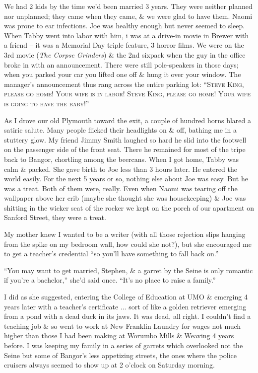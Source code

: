 \documentclass{article}
\numberwithin{equation}{section}
\begin{document}
 We had 2 kids by the time we'd been married 3 years. They were neither planned nor unplanned; they came when they came, \& we were glad to have them. Naomi was prone to ear infections. Joe was healthy enough but never seemed to sleep. When Tabby went into labor with him, i was at a drive-in movie in Brewer with a friend -- it was a Memorial Day triple feature, 3 horror films. We were on the 3rd movie (\textit{The Corpse Grinders}) \& the 2nd sixpack when the guy in the office broke in with an announcement. There were still pole-speakers in those days; when you parked your car you lifted one off \& hung it over your window. The manager's announcement thus rang across the entire parking lot: ``\textsc{Steve King, please go home! Your wife is in labor! Steve King, please go home! Your wife is going to have the baby!}''

As I drove our old Plymouth toward the exit, a couple of hundred horns blared a satiric salute. Many people flicked their headlights on \& off, bathing me in a stuttery glow. My friend Jimmy Smith laughed so hard he slid into the footwell on the passenger side of the front seat. There he remained for most of the tripe back to Bangor, chortling among the beercans. When I got home, Tabby was calm \& packed. She gave birth to Joe less than 3 hours later. He entered the world easily. For the next 5 years or so, nothing else about Joe was easy. But he was a treat. Both of them were, really. Even when Naomi was tearing off the wallpaper above her crib (maybe she thought she was housekeeping) \& Joe was shitting in the wicker seat of the rocker we kept on the porch of our apartment on Sanford Street, they were a treat.

 My mother knew I wanted to be a writer (with all those rejection slips hanging from the spike on my bedroom wall, how could she not?), but she encouraged me to get a teacher's credential ``so you'll have something to fall back on.''

``You may want to get married, Stephen, \& a garret by the Seine is only romantic if you're a bachelor,'' she'd said once. ``It's no place to raise a family.''

I did as she suggested, entering the College of Education at UMO \& emerging 4 years later with a teacher's certificate $\ldots$ sort of like a golden retriever emerging from a pond with a dead duck in its jaws. It was dead, all right. I couldn't find a teaching job \& so went to work at New Franklin Laundry for wages not much higher than those I had been making at Worumbo Mills \& Weaving 4 years before. I was keeping my family in a series of garrets which overlooked not the Seine but some of Bangor's less appetizing streets, the ones where the police cruisers always seemed to show up at 2 o'clock on Saturday morning.
\end{document}
